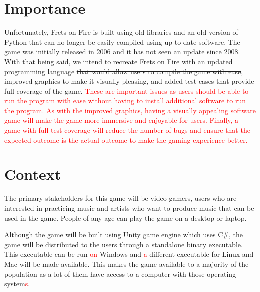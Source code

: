 \documentclass[12pt,letterpaper]{article}
\begin{document}
\section{Importance}
Unfortunately, Frets on Fire is built using old libraries and an old version of Python that can no longer be easily compiled using up-to-date software. The game was initially released in 2006 and it has not seen an update since 2008. With that being said, we intend to recreate Frets on Fire with an updated programming language \sout{that would allow users to compile the game with ease}, improved graphics \sout{to make it visually pleasing}, and added test cases that provide full coverage of the game. \textcolor{red}{These are important issues as users should be able to run the program with ease without having to install additional software to run the program. As with the improved graphics, having a visually appealing software game will make the game more immersive and enjoyable for users. Finally, a game with full test coverage will reduce the number of bugs and ensure that the expected outcome is the actual outcome to make the gaming experience better.}

\section{Context}
The primary stakeholders for this game will be video-gamers, users who are interested in practicing music \sout{and artists who want to produce music that can be used in the game}. People of any age can play the game on a desktop or laptop.

Although the game will be built using Unity game engine which uses C\#, the game will be distributed to the users through a standalone binary executable. This executable can be run \textcolor{red}{on} Windows and \textcolor{red}{a} different executable for Linux and Mac will be made available. This makes the game available to a majority of the population as a lot of them have access to a computer with those operating system\textcolor{red}{s}. \\
\end{document}
